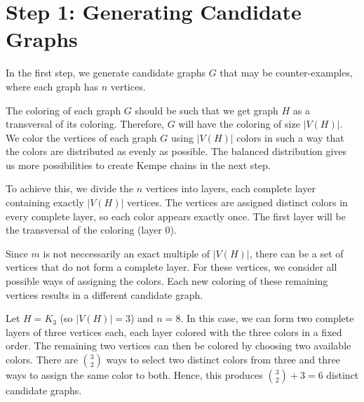 \section{Step 1: Generating Candidate Graphs}
In the first step, we generate candidate graphs \(G\) that may be counter-examples, where each graph has \(n\) vertices.

The coloring of each graph $G$ should be such that we get graph $H$ as a transversal of its coloring. Therefore, $G$ will have the coloring of size $|V(H)|$.
We color the vertices of each graph \(G\) using \( |V(H)| \) colors in such a way that the colors are distributed as evenly as possible. 
The balanced distribution gives us more possibilities to create Kempe chains in the next step.

To achieve this, we divide the \(n\) vertices into layers, each complete layer containing exactly \( |V(H)| \) vertices. 
The vertices are assigned distinct colors in every complete layer, so each color appears exactly once.
The first layer will be the transversal of the coloring (layer 0).

Since \(m\) is not neccessarily an exact multiple of \( |V(H)| \), there can be a set of vertices that do not form a complete layer. 
For these vertices, we consider all possible ways of assigning the colors.
Each new coloring of these remaining vertices results in a different candidate graph.

\begin{example}
 Let \(H = K_3\) (so \( |V(H)| = 3 \)) and \(n = 8\). 
 In this case, we can form two complete layers of three vertices each, each layer colored with the three colors in a fixed order.
 The remaining two vertices can then be colored by choosing two available colors.
 There are \(\binom{3}{2}\) ways to select two distinct colors from three and three ways to assign the same color to both.
 Hence, this produces \(\binom{3}{2} + 3 = 6\) distinct candidate graphs.
\end{example}


